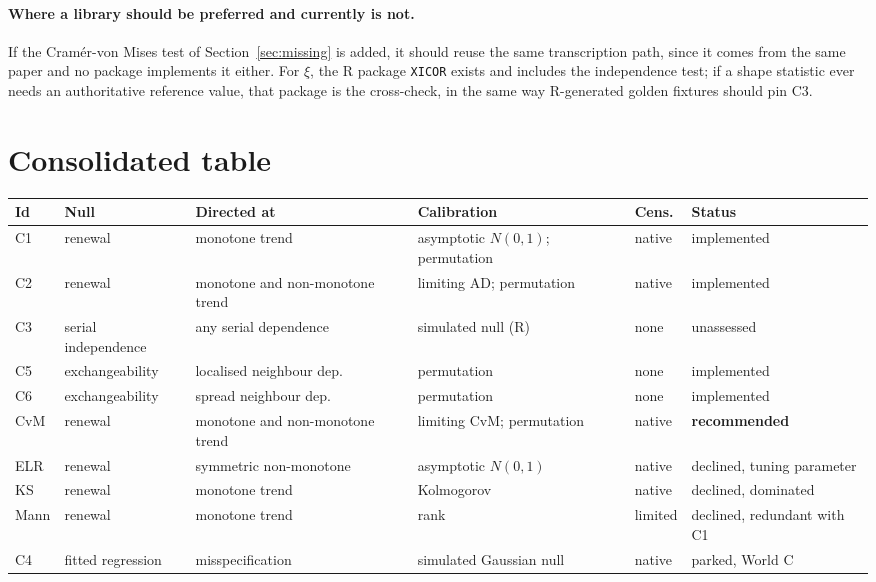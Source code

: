 \documentclass[11pt,a4paper]{article}
\begin{document}
\paragraph{Where a library should be preferred and currently is not.} If the
Cramér-von Mises test of Section~\ref{sec:missing} is added, it should reuse the same
transcription path, since it comes from the same paper and no package implements it
either. For $\xi$, the R package \texttt{XICOR} exists and includes the independence test;
if a shape statistic ever needs an authoritative reference value, that package is the
cross-check, in the same way R-generated golden fixtures should pin C3.

\section{Consolidated table}

\begin{center}
\footnotesize
\setlength{\tabcolsep}{4pt}
\begin{tabular}{@{}>{\raggedright\arraybackslash}p{}
                 >{\raggedright\arraybackslash}p{}
                 >{\raggedright\arraybackslash}p{}
                 >{\raggedright\arraybackslash}p{}
                 >{\raggedright\arraybackslash}p{}
                 >{\raggedright\arraybackslash}p{}@{}}
\toprule
\textbf{Id} & \textbf{Null} & \textbf{Directed at} & \textbf{Calibration} &
\textbf{Cens.} & \textbf{Status}\\
\midrule
C1 & renewal & monotone trend & asymptotic $N(0,1)$; permutation & native & implemented\\
C2 & renewal & monotone and non-monotone trend & limiting AD; permutation & native & implemented\\
C3 & serial independence & any serial dependence & simulated null (R) & none & unassessed\\
C5 & exchangeability & localised neighbour dep. & permutation & none & implemented\\
C6 & exchangeability & spread neighbour dep. & permutation & none & implemented\\
\midrule
CvM & renewal & monotone and non-monotone trend & limiting CvM; permutation & native & \textbf{recommended}\\
ELR & renewal & symmetric non-monotone & asymptotic $N(0,1)$ & native & declined, tuning parameter\\
KS & renewal & monotone trend & Kolmogorov & native & declined, dominated\\
Mann & renewal & monotone trend & rank & limited & declined, redundant with C1\\
C4 & fitted regression & misspecification & simulated Gaussian null & native & parked, World C\\
\bottomrule
\end{tabular}
\end{center}
\end{document}
